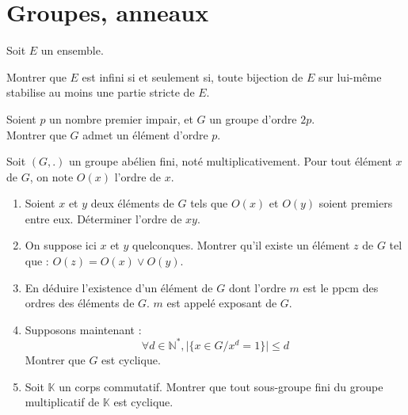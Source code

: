 \section{Groupes, anneaux}

% 


\begin{exer}
Soit $E$ un ensemble.

Montrer que $E$ est infini si et seulement si, toute bijection de $E$ sur lui-même stabilise au moins une partie stricte de $E$.
\end{exer}

\begin{exer}
Soient $p$ un nombre premier impair, et $G$ un groupe d'ordre $2p$.\\
Montrer que $G$ admet un élément d'ordre $p$.
\end{exer}

\begin{exer}
Soit $(G,.)$ un groupe abélien fini, noté multiplicativement. Pour tout élément $x$ de $G$, on note $O(x)$ l'ordre de $x$.
\begin{enumerate}
\item Soient $x$ et $y$ deux éléments de $G$ tels que $O(x)$ et $O(y)$ soient premiers entre eux. Déterminer l'ordre de $xy$.
\item On suppose ici $x$ et $y$ quelconques. Montrer qu'il existe un élément $z$ de $G$ tel que : $O(z) = O(x) \vee O(y)$.
\item\label{ques:ord_ppcm} En déduire l'existence d'un élément de $G$ dont l'ordre $m$ est le ppcm des ordres des éléments de $G$. %
$m$ est appelé exposant de $G$.
\item Supposons maintenant :\[\forall d \in \mathbb{N}^{\ast} , \lvert \{ x \in G / x^d = 1 \} \rvert \leqslant d\]
Montrer que $G$ est cyclique.
\item Soit $\mathbb{K}$ un corps commutatif. Montrer que %
tout sous-groupe fini du groupe multiplicatif de $\mathbb{K}$ est cyclique.
\end{enumerate}
\end{exer}

